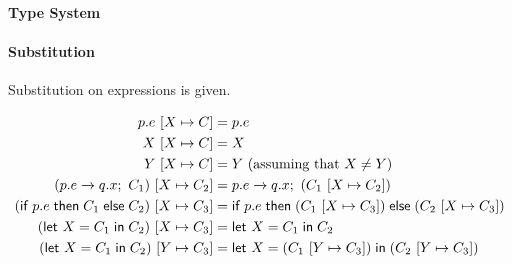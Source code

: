 \documentclass{article}
\theoremstyle{definition}
\newcommand{\bool}{\mathbbm{2}}
\newcommand{\subst}[3]{#1~[#2 \mapsto #3]}
\newcommand{\own}[2]{#1.#2}
\newcommand{\send}[3][]{#2\nolinebreak \mathrel{\xrightarrow{#1}}\nolinebreak #3}
\newcommand{\cif}[3]{\textsf{if}~#1 \mathrel{\textsf{then}}\nolinebreak #2 \mathrel{\textsf{else}}\nolinebreak #3}
\newcommand{\clet}[2]{\textsf{let}~#1\nolinebreak =\nolinebreak #2 \mathrel{\textsf{in}}}
\newcommand{\eppctxt}[2]{\llparenthesis #1 \rrparenthesis_{#2}}
\newcommand{\proves}{\vdash}
\begin{document}
\paragraph{Type System}
\noindent{}

\paragraph{Substitution}

\noindent Substitution on expressions is given.

\begin{align*}
  \subst{p.e}{X}{C} &= p.e \\
  \subst{X}{X}{C} &= X \\
  \subst{Y}{X}{C} &= Y~\text{(assuming that $X \neq Y$)} \\
  \subst{(\send{\own{p}{e}}{\own{q}{x}};~C_1)}{X}{C_2} &= \send{\own{p}{e}}{\own{q}{x}};~(\subst{C_1}{X}{C_2}) \\
  \subst{(\cif{\own{p}{e}}{C_1}{C_2})}{X}{C_3} &= \cif{\own{p}{e}}{(\subst{C_1}{X}{C_3})}{(\subst{C_2}{X}{C_3})}\\
  \subst{(\clet{X}{C_1}{C_2})}{X}{C_3} &= \clet{X}{C_1}{C_2}\\
  \subst{(\clet{X}{C_1}{C_2})}{Y}{C_3} &= \clet{X}{(\subst{C_1}{Y}{C_3})}{(\subst{C_2}{Y}{C_3})}
\end{align*}
\end{document}
